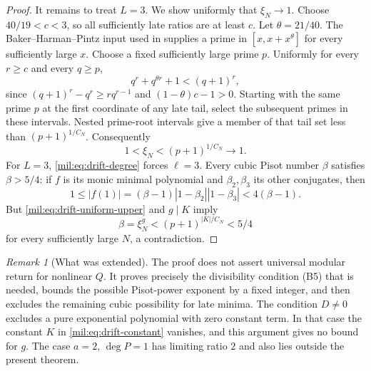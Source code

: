 \documentclass[11pt,a4paper]{article}
\theoremstyle{definition}
\theoremstyle{remark}
\newtheorem{remark}[theorem]{Remark}
\numberwithin{equation}{section}
\begin{document}
\begin{proof}
It remains to treat $L=3$. We show uniformly that $\xi_N\to1$.
Choose $40/19<c<3$, so all sufficiently late ratios are at least $c$.
Let $\theta=21/40$. The Baker--Harman--Pintz input used in
\cite[Theorem~1.6]{SaitoVariants} supplies a prime in
$[x,x+x^\theta]$ for every sufficiently large $x$.
Choose a fixed sufficiently large prime $p$. Uniformly for every
$r\ge c$ and every $q\ge p$,
\[
 q^r+q^{\theta r}+1<(q+1)^r,
\]
since $(q+1)^r-q^r\ge r q^{r-1}$ and
$(1-\theta)c-1>0$. Starting with the same prime $p$ at the first
coordinate of any late tail, select the subsequent primes in these
intervals. Nested prime-root intervals give a member of that tail set
less than $(p+1)^{1/C_N}$. Consequently
\begin{equation}\label{mil:eq:drift-uniform-upper}
 1<\xi_N<(p+1)^{1/C_N}\longrightarrow1.
\end{equation}
For $L=3$, \eqref{mil:eq:drift-degree} forces $\ell=3$. Every cubic Pisot
number $\beta$ satisfies $\beta>5/4$: if $f$ is its monic minimal
polynomial and $\beta_2,\beta_3$ its other conjugates, then
\[
 1\le|f(1)|=(\beta-1)|1-\beta_2||1-\beta_3|<4(\beta-1).
\]
But \eqref{mil:eq:drift-uniform-upper} and $g\mid K$ imply
\[
 \beta=\xi_N^g<(p+1)^{|K|/C_N}<5/4
\]
for every sufficiently large $N$, a contradiction.
\end{proof}

\begin{remark}[What was extended]
The proof does not assert universal modular return for nonlinear
$Q$. It proves precisely the divisibility condition (B5) that is
needed, bounds the possible Pisot-power exponent by a fixed integer,
and then excludes the remaining cubic possibility for late minima.
The condition $D\ne0$ excludes a pure exponential polynomial with zero
constant term. In that case the constant $K$ in
\eqref{mil:eq:drift-constant} vanishes, and this argument gives no bound
for $g$. The case $a=2$, $\deg P=1$ has limiting ratio $2$ and also
lies outside the present theorem.
\end{remark}
\end{document}
